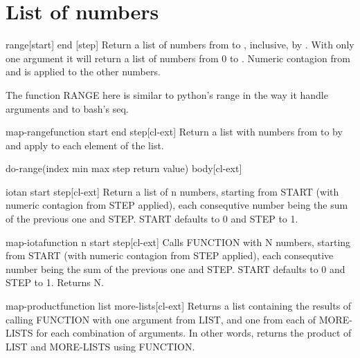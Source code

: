 \documentclass[10pt,english]{book}
\begin{document}
\section{List of numbers}
\label{sec:list-numbers}

\begin{function}{range}{[start] end [step]}
  Return a list of numbers from  to , inclusive,
  by . With only one argument it will return a list of
  numbers from 0 to . Numeric contagion from  and
   is applied to the other numbers.
\begin{devnote}
  The function RANGE here is similar to python's range in the way it
  handle arguments and to bash's seq.
\end{devnote}
\end{function}

\begin{function}{map-range}{function start end \op step}[cl-ext]
  Return a list with numbers from  to  by 
  and apply  to each element of the list.
\end{function}

\begin{macro}{do-range}{(index \op min max step return value) \body body}[cl-ext]
  
\end{macro}

\begin{function}{iota}{n \key start step}[cl-ext]
  Return a list of n numbers, starting from START (with numeric
  contagion from STEP applied), each consequtive number being the sum
  of the previous one and STEP. START defaults to 0 and STEP to 1.
\end{function}

\begin{function}{map-iota}{function n \key start step}[cl-ext]
  Calls FUNCTION with N numbers, starting from START (with numeric contagion
from STEP applied), each consequtive number being the sum of the previous one
and STEP. START defaults to 0 and STEP to 1. Returns N.
\end{function}

\begin{function}{map-product}{function list \rest more-lists}[cl-ext]
  Returns a list containing the results of calling FUNCTION with one argument
from LIST, and one from each of MORE-LISTS for each combination of arguments.
In other words, returns the product of LIST and MORE-LISTS using FUNCTION.
\end{function}

\end{document}
